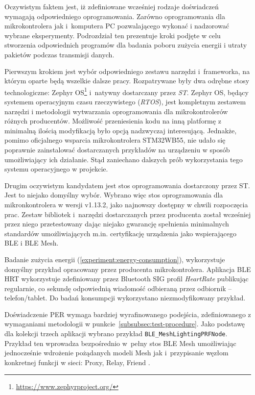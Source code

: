 Oczywistym faktem jest, iż zdefiniowane wcześniej rodzaje doświadczeń wymagają
odpowiedniego oprogramowania. Zarówno oprogramowania dla mikrokontrolera
jak i~komputera PC pozwalającego wykonać i nadzorować wybrane eksperymenty.
Podrozdział ten prezentuje kroki podjęte w celu stworzenia odpowiednich
programów dla badania poboru zużycia energii i utraty pakietów podczas
transmisji danych.

Pierwszym krokiem jest wybór odpowiedniego zestawu narzędzi i~frameworka,
na którym oparte będą wszelkie dalsze pracy. Rozpatrywane były dwa odrębne
stosy technologiczne: Zephyr OS\footnote{\url{https://www.zephyrproject.org/}} i~natywny dostarczany przez \textit{ST}.
Zephyr OS, będący systemem operacyjnym czasu rzeczywistego (\textit{RTOS}), jest kompletnym zestawem
narzędzi i metodologii wytwarzania oprogramowania dla mikrokontrolerów różnych producentów. Możliwość
przeniesienia kodu na inną platformę z minimalną ilością modyfikacją było opcją nadzwyczaj interesującą.
Jednakże, pomimo oficjalnego wsparcia mikrokontrolera STM32WB55, nie udało się poprawnie
zainstalować dostarczanych przykładów na urządzeniu w sposób umożliwiający ich działanie. Stąd zaniechano
dalszych prób wykorzystania tego systemu operacyjnego w projekcie.

Drugim oczywistym kandydatem jest stos oprogramowania dostarczony przez ST. Jest to niejako
domyślny wybór. Wybrano więc stos oprogramowania dla mikronkontrolera w wersji v1.13.2, jako
najnowszy dostępny w chwili rozpoczęcia prac. Zestaw bibliotek i~narzędzi dostarczanych
przez producenta został wcześniej przez niego przetestowany dając niejako gwarancję spełnienia 
minimalnych standardów umożliwiających m.in. certyfikację urządzenia jako wspierającego
BLE i BLE Mesh.


Badanie zużycia energii (\ref{experiment:energy-consumption}), wykorzystuje domyślny przykład opracowany przez producenta
mikrokontrolera. Aplikacja BLE \gls{HRT} wykorzystuje zdefiniowany
przez Bluetooth SIG profil \textit{HeartRate} publikując regularnie, co sekundę
odpowiednią wiadomość odbieraną przez odbiornik -- telefon/tablet. Do badań
konsumpcji wykorzystano niezmodyfikowany przykład.

Doświadczenie \gls{PER} wymaga bardziej wyrafinowanego podejścia, zdefiniowanego z wymaganiami
metodologii w punkcie~\ref{subsubsec:test-procedure}. Jako podstawę dla kolekcji trzech aplikacji
wybrano przykład \texttt{BLE\_MeshLightingPRFNode}. Przykład ten wprowadza bezpośrednio
w~pełny stos BLE Mesh umożliwiając jednocześnie wdrożenie pożądanych modeli Mesh jak
i~przypisanie węzłom konkretnej funkcji w sieci: Proxy, Relay, Friend \cite{st_an5292_2021}.

